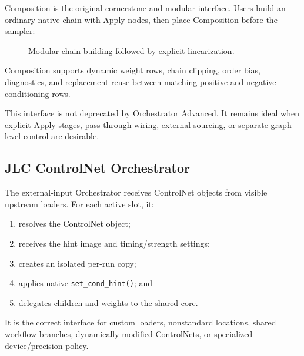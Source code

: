 \documentclass[11pt]{article}
\newcommand{\code}[1]{\texttt{#1}}
\begin{document}
Composition is the original cornerstone and modular interface. Users build an ordinary native chain with Apply nodes, then place Composition before the sampler:

\begin{figure}[H]
\centering
{}
\caption{Modular chain-building followed by explicit linearization.}
\end{figure}

Composition supports dynamic weight rows, chain clipping, order bias, diagnostics, and replacement reuse between matching positive and negative conditioning rows.

This interface is not deprecated by Orchestrator Advanced. It remains ideal when explicit Apply stages, pass-through wiring, external sourcing, or separate graph-level control are desirable.

\subsection{JLC ControlNet Orchestrator}

The external-input Orchestrator receives ControlNet objects from visible upstream loaders. For each active slot, it:

\begin{enumerate}
  \item resolves the ControlNet object;
  \item receives the hint image and timing/strength settings;
  \item creates an isolated per-run copy;
  \item applies native \code{set\_cond\_hint()}; and
  \item delegates children and weights to the shared core.
\end{enumerate}

It is the correct interface for custom loaders, nonstandard locations, shared workflow branches, dynamically modified ControlNets, or specialized device/precision policy.
\end{document}
